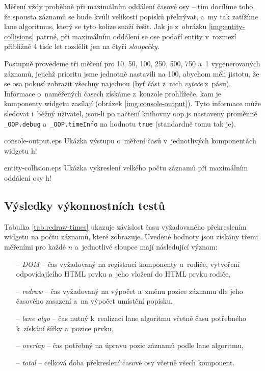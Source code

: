 		Měření vždy proběhně při maximálním oddálení časové osy -- tím docílíme toho, že spousta záznamů se bude kvůli velikosti popisků překrývat, a~my tak zatížíme lane algoritmus, který se tyto kolize snaží řešit. Jak je z~obrázku \ref{img:entity-collisions} patrné, při maximálním oddálení se ose podaří entity v~rozmezí přibližně 4 tisíc let rozdělit jen na čtyři \emph{sloupečky}.
		
		Postupně provedeme tři měření pro 10, 50, 100, 250, 500, 750 a~1 vygenerovaných záznamů, jejichž prioritu jsme jednotně nastavili na 100, abychom měli jistotu, že se osa pokusí zobrazit všechny najednou (byť část z~nich \emph{vyteče} z~pásu). Informace o~naměřených časech získáme z~konzole prohlížeče, kam je komponenty widgetu zasílají (obrázek \ref{img:console-output}). Tyto informace může sledovat i~běžný uživatel, jsou-li po načtení knihovny {\sf oop.js} nastaveny proměnné {\tt \_OOP.debug} a~{\tt \_OOP.time\-Info} na hodnotu {\tt true} (standardně tomu tak je).
		
		
		{}{console-output.eps}
		{Ukázka výstupu o~měření časů v~jednotlivých komponentách widgetu}
		{h!}
		
		{}{entity-collision.eps}
		{Ukázka vykreslení velkého počtu záznamů při maximálním oddálení osy}
		{h!}
						
		\subsection{Výsledky výkonnostních testů}
		Tabulka \ref{tab:redraw-times} ukazuje závislost času vyžadovaného překreslením widgetu na počtu záznamů, které zobrazuje. Uvedené hodnoty jsou získány třemi měřeními pro každé $n$ a~jednotlivé sloupce mají následující význam:
		\begin{itemize}
			\item[--] \emph{DOM} -- čas vyžadovaný na registraci komponenty u~rodiče, vytvoření odpovídajícího HTML prvku a~jeho vložení do HTML prvku rodiče,
			\item[--] \emph{redraw} -- čas vyžadovaný na výpočet a~změnu pozice záznamu dle jeho časového zasazení a~na výpočet umístění popisku,
			\item[--] \emph{lane algo} -- čas nutný k~realizaci lane algoritmu včetně času potřebného k~získání šířky a~pozice prvku,
			\item[--] \emph{overlap} -- čas potřebný na úpravu pozic záznamů podle lane algoritmu,
			\item[--] \emph{total} -- celková doba překreslení časové osy včetně všech komponent.
		\end{itemize}
		
